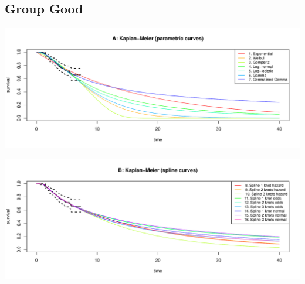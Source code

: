 \documentclass[
]{article}
\begin{document}
\newpage

\hypertarget{group-good}{%
\subsection{Group Good}\label{group-good}}

\begin{flushleft}\includegraphics[height=0.29\textheight]{Images/validate_extrapolation1-1} \end{flushleft}

\begin{flushleft}\includegraphics[height=0.29\textheight]{Images/validate_extrapolation1-2} \end{flushleft}
\end{document}
